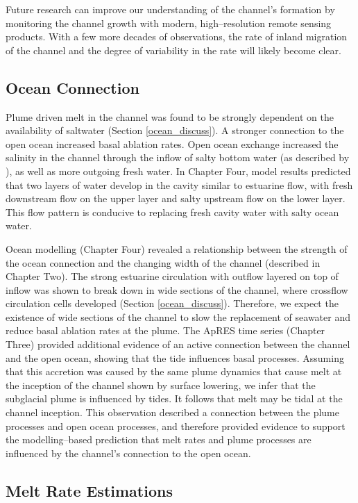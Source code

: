 Future research can improve our understanding of the channel's formation by monitoring the channel growth with modern, high--resolution remote sensing products. With a few more decades of observations, the rate of inland migration of the channel and the degree of variability in the rate will likely become clear.

\subsection{Ocean Connection}

Plume driven melt in the channel was found to be strongly dependent on the availability of saltwater (Section \ref{ocean_discuss}).   A stronger connection to the open ocean increased basal ablation rates.  Open ocean exchange increased the salinity in the channel through the  inflow of salty bottom water (as described by \cite{goldberg2019accurately}), as well as more outgoing fresh water. In Chapter Four, model results predicted that two layers of water develop in the cavity similar to estuarine flow, with fresh downstream flow on the upper layer and salty upstream flow on the lower layer. This flow pattern is conducive to replacing fresh cavity water with salty ocean water. 

Ocean modelling (Chapter Four) revealed a relationship between the strength of the ocean connection and the changing width of the channel (described in Chapter Two). The strong estuarine circulation with outflow layered on top of inflow was shown to break down in wide sections of the channel, where crossflow circulation cells developed (Section \ref{ocean_discuss}). Therefore, we expect the existence of wide sections of the channel to slow the replacement of seawater and reduce basal ablation rates at the plume.
The ApRES time series (Chapter Three) provided additional evidence of an active connection between the channel and the open ocean, showing that the tide influences basal processes. Assuming that this accretion was caused by the same plume dynamics that cause melt at the inception of the channel shown by surface lowering, we infer that the subglacial plume is influenced by tides. It follows that melt may be tidal at the channel inception.
This observation described a connection between the plume processes and open ocean processes, and therefore provided evidence to support the modelling--based prediction that melt rates and plume processes are influenced by the channel's connection to the open ocean. 

\subsection{Melt Rate Estimations}

